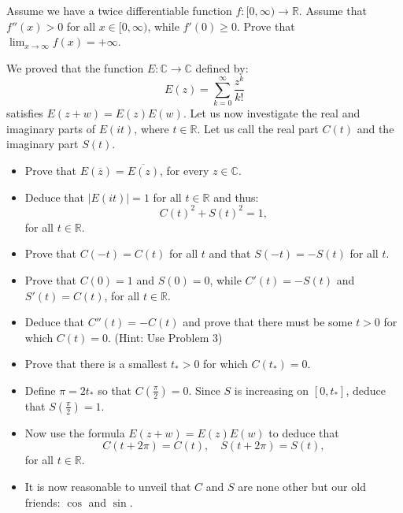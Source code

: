   \begin{exercise}
    Assume we have a twice differentiable function $f : [0, \infty) \to \mathbb{R}$. Assume that $f''(x) > 0$ for all $x \in [0, \infty)$, while $f'(0) \geq 0$. Prove that $\lim_{x\to\infty} f(x) = +\infty$.
  \end{exercise}
  \begin{solution}

  \end{solution}

  \begin{exercise}
    We proved that the function $E : \mathbb{C} \to \mathbb{C}$ defined by:
    \begin{equation}
      E(z) = \sum_{k=0}^{\infty} \frac{z^k}{k!}
    \end{equation}
    satisfies $E(z + w) = E(z)E(w)$. Let us now investigate the real and imaginary parts of $E(it)$, where $t \in \mathbb{R}$. Let us call the real part $C(t)$ and the imaginary part $S(t)$.
    \begin{itemize}
      \item Prove that $E(\overline{z}) = \overline{E(z)}$, for every $z \in \mathbb{C}$.
      \item Deduce that $|E(it)| = 1$ for all $t \in \mathbb{R}$ and thus:
      \begin{equation}
        C(t)^2 + S(t)^2 = 1,
      \end{equation}
      for all $t \in \mathbb{R}$.
      \item Prove that $C(-t) = C(t)$ for all $t$ and that $S(-t) = -S(t)$ for all $t$.
      \item Prove that $C(0) = 1$ and $S(0) = 0$, while $C'(t) = -S(t)$ and $S'(t) = C(t)$, for all $t \in \mathbb{R}$.
      \item Deduce that $C''(t) = -C(t)$ and prove that there must be some $t > 0$ for which $C(t) = 0$. (Hint: Use Problem 3)
      \item Prove that there is a smallest $t_* > 0$ for which $C(t_*) = 0$.
      \item Define $\pi = 2t_*$ so that $C(\frac{\pi}{2}) = 0$. Since $S$ is increasing on $[0, t_*]$, deduce that $S(\frac{\pi}{2}) = 1$.
      \item Now use the formula $E(z + w) = E(z)E(w)$ to deduce that
      \begin{equation}
        C(t + 2\pi) = C(t), \quad S(t + 2\pi) = S(t),
      \end{equation}
      for all $t \in \mathbb{R}$.
      \item It is now reasonable to unveil that $C$ and $S$ are none other but our old friends: $\cos$ and $\sin$.
    \end{itemize}
  \end{exercise}
  \begin{solution}

  \end{solution}

